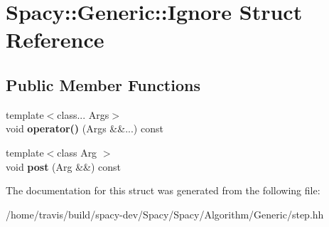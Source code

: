 \hypertarget{structSpacy_1_1Generic_1_1Ignore}{\section{\-Spacy\-:\-:\-Generic\-:\-:\-Ignore \-Struct \-Reference}
\label{structSpacy_1_1Generic_1_1Ignore}
}
\subsection*{\-Public \-Member \-Functions}
\begin{DoxyCompactItemize}
\item 
\hypertarget{structSpacy_1_1Generic_1_1Ignore_ac12f69ea973294c5d25f24d1a7d2f50b}{{\footnotesize template$<$class... \-Args$>$ }\\void {\bfseries operator()} (\-Args \&\&...) const }\label{structSpacy_1_1Generic_1_1Ignore_ac12f69ea973294c5d25f24d1a7d2f50b}

\item 
\hypertarget{structSpacy_1_1Generic_1_1Ignore_a1e9c15cacc52b4da38ad4745b275acb9}{{\footnotesize template$<$class Arg $>$ }\\void {\bfseries post} (\-Arg \&\&) const }\label{structSpacy_1_1Generic_1_1Ignore_a1e9c15cacc52b4da38ad4745b275acb9}

\end{DoxyCompactItemize}


\-The documentation for this struct was generated from the following file\-:\begin{DoxyCompactItemize}
\item 
/home/travis/build/spacy-\/dev/\-Spacy/\-Spacy/\-Algorithm/\-Generic/step.\-hh\end{DoxyCompactItemize}
